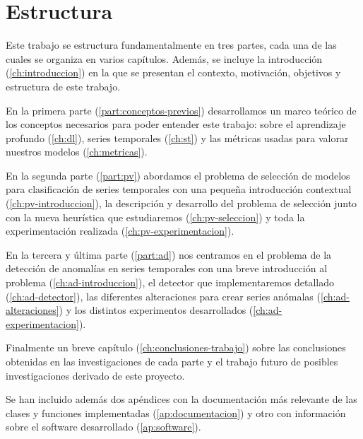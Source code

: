 \section{Estructura}

Este trabajo se estructura fundamentalmente en tres partes, cada una de las cuales se organiza en varios capítulos. Además, se incluye la introducción (\autoref{ch:introduccion}) en la que se presentan el contexto, motivación, objetivos y estructura de este trabajo.

En la primera parte (\autoref{part:conceptos-previos}) desarrollamos un marco teórico de los conceptos necesarios para poder entender este trabajo: sobre el aprendizaje profundo (\autoref{ch:dl}), series temporales (\autoref{ch:st}) y las métricas usadas para valorar nuestros modelos (\autoref{ch:metricas}).

En la segunda parte (\autoref{part:pv}) abordamos el problema de selección de modelos para clasificación de series temporales con una pequeña introducción contextual (\autoref{ch:pv-introduccion}), la descripción y desarrollo del problema de selección junto con la nueva heurística que estudiaremos (\autoref{ch:pv-seleccion}) y toda la experimentación realizada (\autoref{ch:pv-experimentacion}).

En la tercera y última parte (\autoref{part:ad}) nos centramos en el problema de la detección de anomalías en series temporales con una breve introducción al problema (\autoref{ch:ad-introduccion}), el detector que implementaremos detallado (\autoref{ch:ad-detector}), las diferentes alteraciones para crear series anómalas (\autoref{ch:ad-alteraciones}) y los distintos experimentos desarrollados (\autoref{ch:ad-experimentacion}).

Finalmente un breve capítulo (\autoref{ch:conclusiones-trabajo}) sobre las conclusiones obtenidas en las investigaciones de cada parte y el trabajo futuro de posibles investigaciones derivado de este proyecto.

Se han incluido además dos apéndices con la documentación más relevante de las clases y funciones implementadas (\autoref{ap:documentacion}) y otro con información sobre el software desarrollado (\autoref{ap:software}).

\endinput
